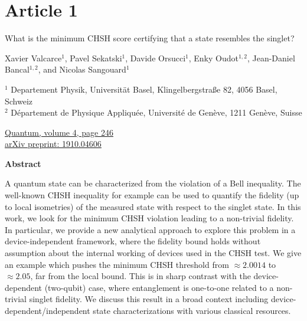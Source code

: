 \chapter*{Article 1}

\centering
\textrm{\LARGE What is the minimum CHSH score certifying that a state resembles the singlet?}

\vspace{2cm}

\normalsize
Xavier Valcarce$^1$, Pavel Sekatski$^1$, Davide Orsucci$^1$, Enky Oudot$^{1,2}$, Jean-Daniel Bancal$^{1,2}$, and Nicolas Sangouard$^1$
\bigbreak

{\footnotesize
$^1$ Departement Physik, Universität Basel, Klingelbergstraße 82, 4056 Basel, Schweiz \\
$^2$ Département de Physique Appliquée, Université de Genève, 1211 Genève, Suisse
}

\raggedright
\bigbreak
\faLink \quad \href{https://quantum-journal.org/papers/q-2020-03-23-246/}{Quantum, volume 4, page 246} \\
\faLink \quad \href{https://arxiv.org/abs/1910.04606}{arXiv preprint: 1910.04606}
\vspace{1cm}

\centering
\textbf{Abstract}
\bigbreak

A quantum state can be characterized from the violation of a Bell inequality.
The well-known CHSH inequality for example can be used to quantify the fidelity (up to local isometries) of the measured state with respect to the singlet state.
In this work, we look for the minimum CHSH violation leading to a non-trivial fidelity.
In particular, we provide a new analytical approach to explore this problem in a device-independent framework, where the fidelity bound holds without assumption about the internal working of devices used in the CHSH test.
We give an example which pushes the minimum CHSH threshold from $\approx 2.0014$ to $\approx 2.05$, far from the local bound.
This is in sharp contrast with the device-dependent (two-qubit) case, where entanglement is one-to-one related to a non-trivial singlet fidelity.
We discuss this result in a broad context including device-dependent/independent state characterizations with various classical resources.
